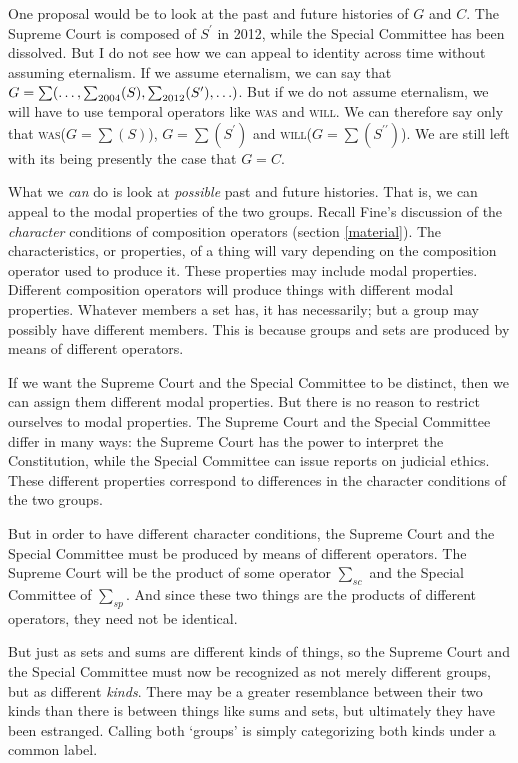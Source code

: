 \documentclass[11pt]{article}
\begin{document}
\begin{spacing}{1.5}

One proposal would be to look at the past and future histories of $G$
and $C$.  The Supreme Court is composed of $S^{\prime}$ in 2012, while
the Special Committee has been dissolved.  But I do not see how we can
appeal to identity across time without assuming eternalism.  If we
assume eternalism, we can say that $G = \sum ( \mathellipsis , \sum
_{2004}(S), \sum _{2012}(S^{\prime}), \mathellipsis )$.  But if we do
not assume eternalism, we will have to use temporal operators like
\textsc{was} and \textsc{will}.  We can therefore say only that
\textsc{was}($G = \sum (S)$), $G = \sum (S^{\prime})$ and
\textsc{will}($G = \sum (S^{\prime \prime})$).  We are still left with
its being presently the case that $G = C$.

What we {\em can} do is look at {\em possible} past and future
histories.  That is, we can appeal to the modal properties of the two
groups.  Recall Fine's discussion of the {\em character} conditions of
composition operators (section \ref{material}).  The characteristics,
or properties, of a thing will vary depending on the composition
operator used to produce it.  These properties may include modal
properties.  Different composition operators will produce things with
different modal properties.  Whatever members a set has, it has
necessarily; but a group may possibly have different members.  This is
because groups and sets are produced by means of different operators.

If we want the Supreme Court and the Special Committee to be distinct,
then we can assign them different modal properties.  But there is no
reason to restrict ourselves to modal properties.  The Supreme Court
and the Special Committee differ in many ways: the Supreme Court has
the power to interpret the Constitution, while the Special Committee
can issue reports on judicial ethics.  These different properties
correspond to differences in the character conditions of the two
groups.

But in order to have different character conditions, the Supreme Court
and the Special Committee must be produced by means of different
operators.  The Supreme Court will be the product of some operator
$\sum _{sc}$ and the Special Committee of $\sum _{sp}$.  And since
these two things are the products of different operators, they need
not be identical.

But just as sets and sums are different kinds of things, so the
Supreme Court and the Special Committee must now be recognized as not
merely different groups, but as different {\em kinds}.  There may be a
greater resemblance between their two kinds than there is between
things like sums and sets, but ultimately they have been estranged.
Calling both `groups' is simply categorizing both kinds under a common
label.


\end{spacing}
\end{document}
